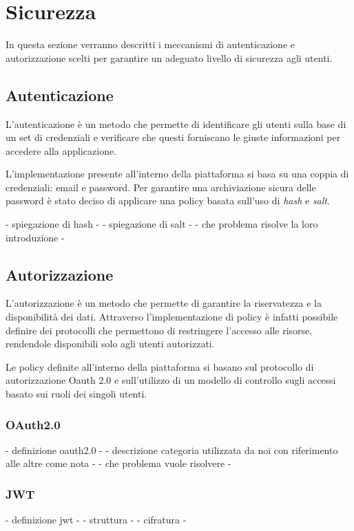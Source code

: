 \section{Sicurezza}
In questa sezione verranno descritti i meccanismi di autenticazione e autorizzazione scelti per
garantire un adeguato livello di sicurezza agli utenti.

\subsection{Autenticazione}
L'autenticazione è un metodo che permette di identificare gli utenti sulla base di un set di credenziali e
verificare che questi forniscano le giuste informazioni per accedere alla applicazione.

L'implementazione presente all'interno della piattaforma si basa su una coppia di credenziali: email e password.
Per garantire una archiviazione sicura delle password è stato deciso di applicare una policy basata sull'uso di \textit{hash} e \textit{salt}.


- spiegazione di hash -
- spiegazione di salt -
- che problema risolve la loro introduzione -


\subsection{Autorizzazione}
L'autorizzazione è un metodo che permette di garantire la riservatezza e la disponibilità dei dati.
Attraverso l'implementazione di policy è infatti possibile definire dei protocolli che permettono di restringere l'accesso alle risorse,
rendendole disponibili solo agli utenti autorizzati.

Le policy definite all'interno della piattaforma si basano sul protocollo di autorizzazione Oauth 2.0 \cite{rfc6749} e sull'utilizzo di un
modello di controllo sugli accessi basato sui ruoli dei singoli utenti.


\subsubsection{OAuth2.0}
- definizione oauth2.0 -
- descrizione categoria utilizzata da noi con riferimento alle altre come nota -
- che problema vuole risolvere -

\subsubsection{JWT}
- definizione jwt -
- struttura -
- cifratura -